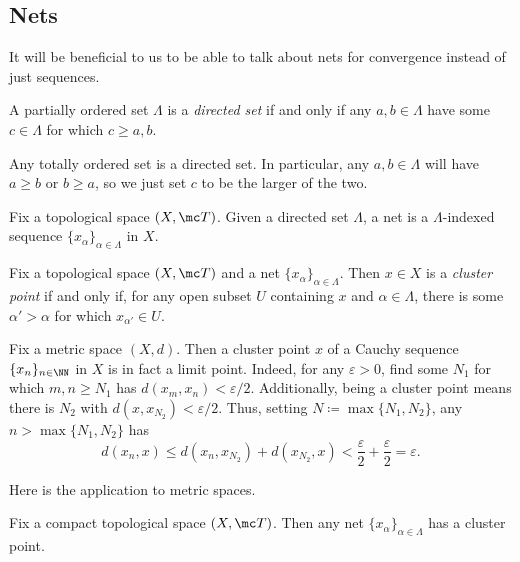 \documentclass[../notes.tex]{subfiles}
\begin{document}
\subsection{Nets}
It will be beneficial to us to be able to talk about nets for convergence instead of just sequences.
\begin{definition}
	A partially ordered set $\Lambda$ is a \textit{directed set} if and only if any $a,b\in\Lambda$ have some $c\in\Lambda$ for which $c\ge a,b$.
\end{definition}
\begin{example}
	Any totally ordered set is a directed set. In particular, any $a,b\in\Lambda$ will have $a\ge b$ or $b\ge a$, so we just set $c$ to be the larger of the two.
\end{example}
\begin{definition}[Net]
	Fix a topological space $(X,\mc T)$. Given a directed set $\Lambda$, a net is a $\Lambda$-indexed sequence $\{x_\alpha\}_{\alpha\in\Lambda}$ in $X$.
\end{definition}
\begin{definition}
	Fix a topological space $(X,\mc T)$ and a net $\{x_\alpha\}_{\alpha\in\Lambda}$. Then $x\in X$ is a \textit{cluster point} if and only if, for any open subset $U$ containing $x$ and $\alpha\in\Lambda$, there is some $\alpha'>\alpha$ for which $x_{\alpha'}\in U$.
\end{definition}
\begin{remark} \label{rem:cluster-is-limit}
	Fix a metric space $(X,d)$. Then a cluster point $x$ of a Cauchy sequence $\{x_n\}_{n\in\NN}$ in $X$ is in fact a limit point. Indeed, for any $\varepsilon>0$, find some $N_1$ for which $m,n\ge N_1$ has $d(x_m,x_n)<\varepsilon/2$. Additionally, being a cluster point means there is $N_2$ with $d(x,x_{N_2})<\varepsilon/2$. Thus, setting $N\coloneqq\max\{N_1,N_2\}$, any $n>\max\{N_1,N_2\}$ has
	\[d(x_n,x)\le d(x_n,x_{N_2})+d(x_{N_2},x)<\frac\varepsilon2+\frac\varepsilon2=\varepsilon.\]
\end{remark}
Here is the application to metric spaces.
\begin{proposition} \label{prop:nets-cluster}
	Fix a compact topological space $(X,\mc T)$. Then any net $\{x_\alpha\}_{\alpha\in\Lambda}$ has a cluster point.
\end{proposition}
\end{document}
